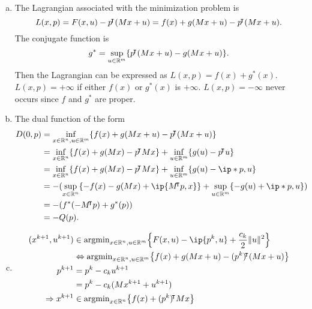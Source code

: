 \documentclass{article}
\begin{document}
\begin{solution}
\begin{enumerate}[(a)]
{\begin{proof}
                We can prove the proper function using prove by contradiction.  Suppose $F(x, u)=f(x)+g(Mx+u)=+\infty$ for all $(x, u)\in\R^n\times\R^m$. Since $f$ and $g$ are proper, there exist $x_0\in \R^n$ and $z_0\in\R^m$ such that $f(x_0)$ and $g(z_0)$ are finite. Let $u_0=z_0-Mx_0$, then $f(x_0)+g(Mx_0+u_0)=f(x_0)+g(z_0)$ is finite, which contradicts the assumption. Therefore, $F$ is proper.
            \end{proof}
        }
        \item The Lagrangian associated with the minimization problem is \[L(x, p) = F(x,u)-p{}^{\mkern-4mu\intercal} (Mx+u)=f(x)+g(Mx+u)-p{}^{\mkern-4mu\intercal} (Mx+u).\] The conjugate function is \[g^*=\sup_{u\in\R^m}\braces*{p\trn (Mx+u)-g(Mx+u)}.\] Then the Lagrangian can be expressed as $L(x, p) = f(x)+g^*(x)$. $L(x,p)=+\infty$  if either $f(x)$ or $g^*(x)$ is $+\infty$. $L(x,p)=-\infty$ never occurs since $f$ and $g^*$ are proper.
        \item {
            The dual function of the form
            \begin{align*}
                D(0,p)
                &= \inf_{x\in\R^n, u\in\R^m}\braces*{f(x)+g(Mx+u)-p\trn (Mx+u)} \\
                &= \inf_{x\in\R^n} \braces*{f(x)+g(Mx)-p\trn Mx}+\inf_{u\in\R^m}\braces*{g(u)-p\trn u} \\
                &= \inf_{x\in\R^n} \braces*{f(x)+g(Mx)-p\trn Mx}+\inf_{u\in\R^m}\braces*{g(u)-\ip*{p, u}} \\
                &= -(\sup_{x\in\R^n}\braces*{-f(x)-g(Mx)+\ip{M\trn p,x}}+\sup_{u\in\R^m}\braces*{-g(u)+\ip*{p, u}}) \\
                &= -(f^*(-M\trn p)+g^*(p)) \\
                &= -Q(p).
            \end{align*}
        }
        \item {
            \begin{align*}
                (x^{k+1}, u^{k+1}) &\in \argmin_{x\in\R^n, u\in\R^m}\braces*{F(x, u)-\ip{p^k, u}+\frac{c_k}{2}\norm{u}^2} \\
                &\Leftrightarrow \argmin_{x\in\R^n, u\in\R^m}\braces*{f(x)+g(Mx+u)-(p^k)\trn (Mx+u)} \\
                p^{k+1} &= p^k-c_ku^{k+1} \\
                &= p^k-c_k(Mx^{k+1}+u^{k+1}) \\
                \Rightarrow
                x^{k+1} &\in \argmin_{x\in\R^n}\braces*{f(x)+(p^k)\trn Mx} \\

\end{align*}}
\end{enumerate}
\end{solution}
\end{document}
